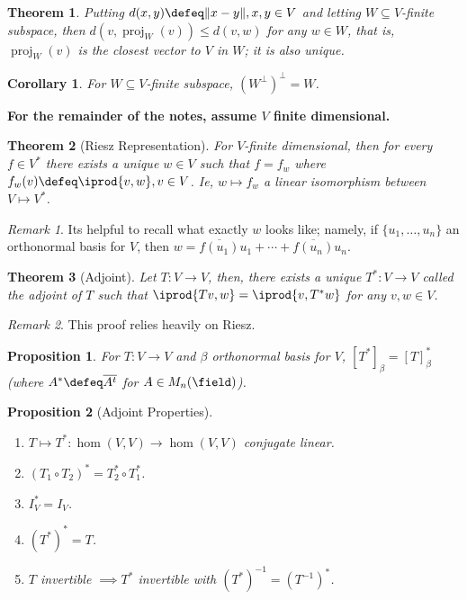 \documentclass[12pt, oneside]{article}
\theoremstyle{definition}
\theoremstyle{plain}
\newtheorem{thm}{Theorem}
\newtheorem{cor}{Corollary}
\newtheorem{prop}{Proposition}
\theoremstyle{remark}
\newtheorem{remark}{Remark}
\DeclareMathOperator{\proj}{proj}
\begin{document}
\begin{thm}
  Putting $d(x, y) \defeq \norm{x - y}, x, y\in V$ and letting $W \subseteq V$-finite subspace, then $d(v, \proj_W(v)) \leq d(v, w)$ for any $w \in W$, that is, $\proj_W(v)$ is the closest vector to $V$ in $W$; it is also unique.
\end{thm}

\begin{cor}
  For $W \subseteq V$-finite subspace, $(W^\perp)^\perp = W$.
\end{cor}

\textbf{For the remainder of the notes, assume $V$ finite dimensional.}

\begin{thm}[Riesz Representation]
  For $V$-finite dimensional, then for every $f \in V^\ast$ there exists a unique $w \in V$ such that $f = f_w$ where $f_w(v) \defeq \iprod{v, w}, v \in V$. Ie, $w \mapsto f_w$ a linear isomorphism between $V \mapsto V^\ast$.
\end{thm}
\begin{remark}
  Its helpful to recall what exactly $w$ looks like; namely, if $\{u_1, \dots, u_n\}$ an orthonormal basis for $V$, then $w = \overline{f(u_1)}u_1 + \cdots + \overline{f(u_n)}u_n$.
\end{remark}

\begin{thm}[Adjoint]
  Let $T:V\to V $, then, there exists a unique $T^\ast : V \to V$ called the adjoint of $T$ such that $\iprod{Tv, w} = \iprod{v, T^\ast w}$ for any $v, w \in V$.
\end{thm}
\begin{remark}
  This proof relies heavily on Riesz.
\end{remark}

\begin{prop}
  For $T : V \to V$ and $\beta$ orthonormal basis for $V$, $[T^\ast]_\beta = [T]_\beta^\ast$  (where $A^\ast \defeq \overline{A^t}$ for $A \in M_n(\field)$).
\end{prop}

\begin{prop}[Adjoint Properties]
  \begin{enumerate}[label=(\alph*)]
    \item $T \mapsto T^\ast : \hom(V, V) \to \hom(V, V)$ conjugate linear.
    \item $(T_1 \circ T_2)^\ast = T_2^\ast \circ T_1^\ast$.
    \item $I_V^\ast = I_V$.
    \item $(T^\ast)^\ast = T$.
    \item $T$ invertible $\implies T^\ast$ invertible with $(T^\ast)^{-1} = (T^{-1})^\ast$.
  \end{enumerate}
\end{prop}
\end{document}
